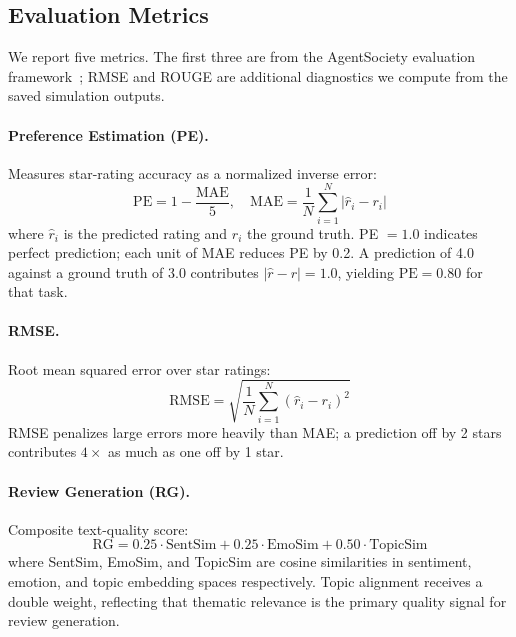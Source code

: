 \documentclass[11pt]{article}
\begin{document}
\subsection{Evaluation Metrics}

We report five metrics. The first three are from the AgentSociety evaluation
framework~\citep{websocietysimulator2025}; RMSE and ROUGE are additional
diagnostics we compute from the saved simulation outputs.

\paragraph{Preference Estimation (PE).}
Measures star-rating accuracy as a normalized inverse error:
\begin{equation}
\text{PE} = 1 - \frac{\text{MAE}}{5}, \quad
\text{MAE} = \frac{1}{N}\sum_{i=1}^{N} |\hat{r}_i - r_i|
\label{eq:pe}
\end{equation}
where $\hat{r}_i$ is the predicted rating and $r_i$ the ground truth.
PE $= 1.0$ indicates perfect prediction; each unit of MAE reduces PE by 0.2.
A prediction of 4.0 against a ground truth of 3.0 contributes
$|\hat{r} - r| = 1.0$, yielding $\text{PE} = 0.80$ for that task.

\paragraph{RMSE.}
Root mean squared error over star ratings:
\begin{equation}
\text{RMSE} = \sqrt{\frac{1}{N}\sum_{i=1}^{N}(\hat{r}_i - r_i)^2}
\label{eq:rmse}
\end{equation}
RMSE penalizes large errors more heavily than MAE; a prediction
off by 2 stars contributes $4\times$ as much as one off by 1 star.

\paragraph{Review Generation (RG).}
Composite text-quality score:
\begin{equation}
\text{RG} = 0.25 \cdot \text{SentSim}
           + 0.25 \cdot \text{EmoSim}
           + 0.50 \cdot \text{TopicSim}
\label{eq:rg}
\end{equation}
where SentSim, EmoSim, and TopicSim are cosine similarities in sentiment,
emotion, and topic embedding spaces respectively.
Topic alignment receives a double weight, reflecting that thematic relevance
is the primary quality signal for review generation.
\end{document}
